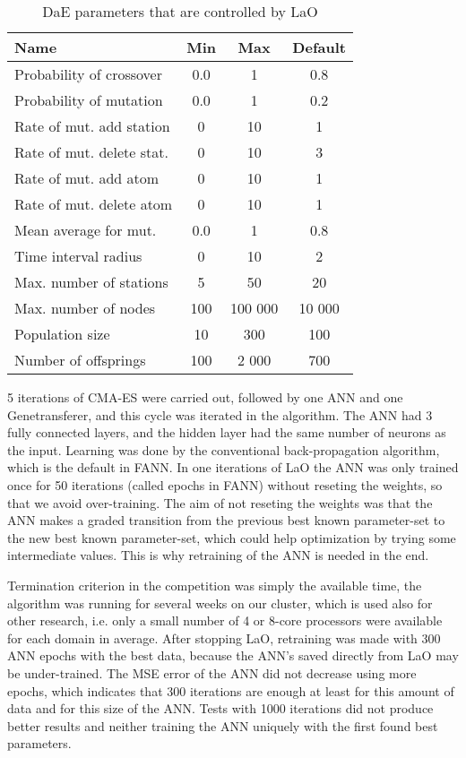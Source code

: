 \documentclass{article}
\begin{document}
\begin{table}[ht]
\centering
\begin{tabular}{l c c c}
\hline\hline
Name & Min & Max & Default \\ 
\hline
Probability of crossover & 0.0 & 1 & 0.8 \\
Probability of mutation & 0.0& 1& 0.2 \\
Rate of mut. add station& 0& 10& 1 \\
Rate of mut. delete stat.& 0& 10& 3 \\
Rate of mut. add atom& 0& 10& 1 \\
Rate of mut. delete atom& 0& 10& 1 \\
Mean average for mut.& 0.0& 1& 0.8 \\
Time interval radius& 0& 10& 2 \\
Max. number of stations& 5& 50& 20 \\
Max. number of nodes& 100& 100 000& 10 000 \\
Population size& 10& 300& 100 \\
Number of offsprings & 100& 2 000& 700 \\
\hline
\end{tabular}
\caption{DaE parameters that are controlled by LaO}
\label{table:parameters}
\end{table} 


5 iterations of CMA-ES were carried out, followed by one ANN and one Genetransferer, and this cycle was iterated in the algorithm. The ANN had 3 fully connected layers, and the hidden layer had the same number of neurons as the input. Learning was done by the conventional back-propagation algorithm, which is the default in FANN. In one iterations of LaO the ANN was only trained once for 50 iterations (called epochs in FANN) without reseting the weights, so that we avoid over-training. The aim of not reseting the weights was that the ANN makes a graded transition from the previous best known parameter-set to the new best known parameter-set, which could help optimization by trying some intermediate values. This is why retraining of the ANN is needed in the end.

Termination criterion in the competition was simply the available time, the algorithm was running for several weeks on our cluster, which is used also for other research, i.e. only a small number of 4 or 8-core processors were available for each domain in average. After stopping LaO, retraining was made with 300 ANN epochs with the best data, because the ANN's saved directly from LaO may be under-trained. The MSE error of the ANN did not decrease using more epochs, which indicates that 300 iterations are enough at least for this amount of data and for this size of the ANN. Tests with 1000 iterations did not produce better results and neither training the ANN uniquely with the first found best parameters.
\end{document}
